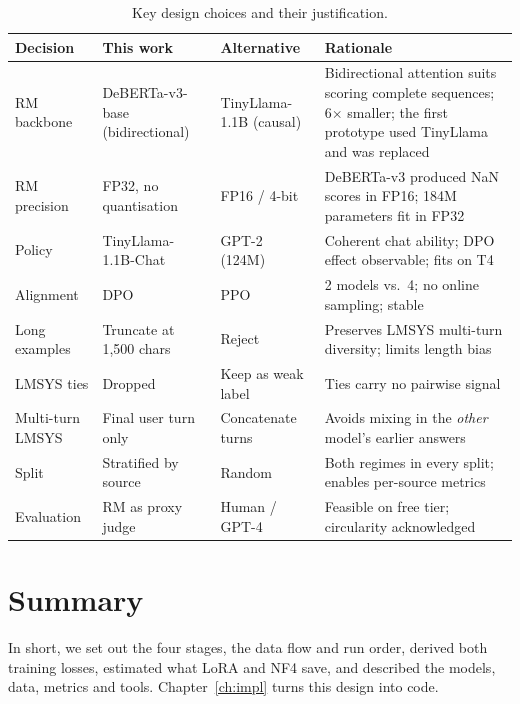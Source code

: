 \begin{table}[!htbp]
\centering
\caption[Key design choices]{Key design choices and their justification.}
\label{tab:design}
\small
\begin{tabularx}{\textwidth}{@{}L{2.2cm}L{3.2cm}L{2.7cm}Y@{}}
\toprule
\textbf{Decision} & \textbf{This work} & \textbf{Alternative} & \textbf{Rationale}\\
\midrule
RM backbone & DeBERTa-v3-base (bidirectional) & TinyLlama-1.1B (causal) & Bidirectional attention suits scoring complete sequences; 6$\times$ smaller; the first prototype used TinyLlama and was replaced\\
RM precision & FP32, no quantisation & FP16 / 4-bit & DeBERTa-v3 produced NaN scores in FP16; 184M parameters fit in FP32\\
Policy & TinyLlama-1.1B-Chat & GPT-2 (124M) & Coherent chat ability; DPO effect observable; fits on T4\\
Alignment & DPO & PPO & 2 models vs.\ 4; no online sampling; stable\\
Long examples & Truncate at 1,500 chars & Reject & Preserves LMSYS multi-turn diversity; limits length bias\\
LMSYS ties & Dropped & Keep as weak label & Ties carry no pairwise signal\\
Multi-turn LMSYS & Final user turn only & Concatenate turns & Avoids mixing in the \emph{other} model's earlier answers\\
Split & Stratified by source & Random & Both regimes in every split; enables per-source metrics\\
Evaluation & RM as proxy judge & Human / GPT-4 & Feasible on free tier; circularity acknowledged\\
\bottomrule
\end{tabularx}
\end{table}

\section{Summary}
In short, we set out the four stages, the data flow and run order, derived both training losses, estimated what LoRA and NF4 save, and described the models, data, metrics and tools. Chapter~\ref{ch:impl} turns this design into code.
